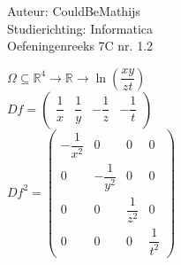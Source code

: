 \documentclass[a4paper]{article}
\begin{document}
  
\noindent \large Auteur: CouldBeMathijs \\
\noindent \large Studierichting: Informatica\\
\noindent \large Oefeningenreeks 7C nr. 1.2\\

\medskip

\normalsize

$\Omega \subseteq \mathbb{R}^4 \to \mathbb{R} \to \ln\left(\dfrac{xy}{zt}\right)$\\

$Df = \left( \begin{array}{cccc} \dfrac{1}{x} & \dfrac{1}{y} & -\dfrac{1}{z} & -\dfrac{1}{t} \end{array} \right)$\\

$Df^2 = \left( \begin{array}{cccc}
	- \dfrac{1}{x^2}	&0	&0	&0	\\
	0	& -\dfrac{1}{y^2} 	&0	&0	\\
	0	&0	& \dfrac{1}{z^2}	&0	\\
	0	&0	&0	& \dfrac{1}{t^2}
\end{array}\right)$
\begin{thebibliography}{999}
\end{thebibliography}
\end{document}
